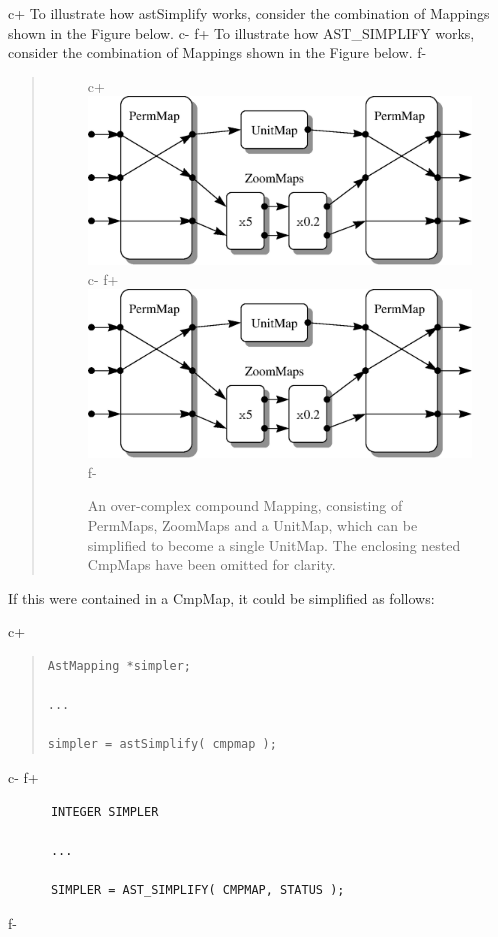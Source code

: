 \documentclass[twoside,11pt]{article}
\begin{document}
\begin{htmlonly}
c+
   To illustrate how astSimplify works, consider the combination of
   Mappings shown in the Figure below.
c-
f+
   To illustrate how AST\_SIMPLIFY works, consider the combination of
   Mappings shown in the Figure below.
f-
   \begin{quote}
   \begin{figure}
   \label{fig:simplifyexample}
c+
   \includegraphics[scale=1.1]{sun211_figures/simpexamp.eps}
c-
f+
   \includegraphics[scale=1.1]{sun210_figures/simpexamp.eps}
f-
   \caption{An over-complex compound Mapping, consisting of PermMaps,
   ZoomMaps and a UnitMap, which can be simplified to become a single
   UnitMap.  The enclosing nested CmpMaps have been omitted for clarity.}
   \end{figure}
   \end{quote}
\end{htmlonly}
If this were contained in a CmpMap, it could be simplified as follows:

c+
\begin{quote}
\small
\begin{verbatim}
AstMapping *simpler;

...

simpler = astSimplify( cmpmap );
\end{verbatim}
\normalsize
\end{quote}
c-
f+
\small
\begin{verbatim}
      INTEGER SIMPLER

      ...

      SIMPLER = AST_SIMPLIFY( CMPMAP, STATUS );
\end{verbatim}
\normalsize
f-
\end{document}
